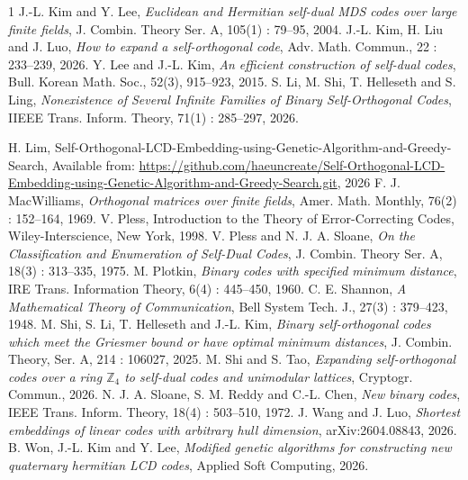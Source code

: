 \documentclass{article}
\begin{document}
\begin{thebibliography}{1}
J.-L. Kim and Y. Lee,
\emph{Euclidean and Hermitian self-dual {MDS} codes over large finite fields},
J. Combin. Theory Ser. A,
105(1) : 79--95, 2004.
J.-L. Kim, H. Liu and J. Luo,
\emph{How to expand a self-orthogonal code},
Adv. Math. Commun.,
22 : 233--239, 2026.
Y. Lee and J.-L. Kim,
\emph{An efficient construction of self-dual codes},
Bull. Korean Math. Soc.,
52(3), 915--923, 2015.
S. Li, M. Shi, T. Helleseth and S. Ling,
\emph{Nonexistence of Several Infinite Families of Binary Self-Orthogonal Codes},
IIEEE Trans. Inform. Theory,
71(1) : 285--297, 2026.
\leavevmode\raggedright
H. Lim,
Self-Orthogonal-LCD-Embedding-using-Genetic-Algorithm-and-Greedy-Search,
Available from: \url{https://github.com/haeuncreate/Self-Orthogonal-LCD-Embedding-using-Genetic-Algorithm-and-Greedy-Search.git},
2026
F. J. MacWilliams,
\emph{Orthogonal matrices over finite fields},
Amer. Math. Monthly,
76(2) : 152--164, 1969.
V. Pless,
Introduction to the Theory of Error-Correcting Codes,
Wiley-Interscience, New York, 1998.
V. Pless and N. J. A. Sloane,
\emph{On the Classification and Enumeration of Self-Dual Codes},
J. Combin. Theory Ser. A,
18(3) : 313--335, 1975.
M. Plotkin,
\emph{Binary codes with specified minimum distance},
IRE Trans. Information Theory,
6(4) : 445--450, 1960.
C. E. Shannon,
\emph{A Mathematical Theory of Communication},
Bell System Tech. J.,
27(3) : 379--423, 1948.
M. Shi, S. Li, T. Helleseth and J.-L. Kim,
\emph{Binary self-orthogonal codes which meet the Griesmer bound or have optimal minimum distances},
J. Combin. Theory, Ser. A,
214 : 106027, 2025.
M. Shi and S. Tao,
\emph{Expanding self-orthogonal codes over a ring $\mathbb{Z}_4$ to self-dual codes and unimodular lattices},
Cryptogr. Commun., 2026.
N. J. A. Sloane, S. M. Reddy and C.-L. Chen,
\emph{New binary codes},
IEEE Trans. Inform. Theory,
18(4) : 503--510, 1972.
J. Wang and J. Luo,
\emph{Shortest embeddings of linear codes with arbitrary hull dimension},
arXiv:2604.08843, 2026.
B. Won, J.-L. Kim and Y. Lee,
\emph{Modified genetic algorithms for constructing new quaternary hermitian LCD codes},
Applied Soft Computing, 2026.
\end{thebibliography}
\end{document}
